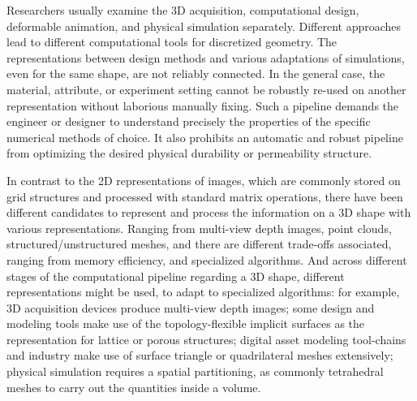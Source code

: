 Researchers usually examine the 3D acquisition, computational design, deformable animation, and physical simulation separately. Different approaches lead to different computational tools for discretized geometry.
The representations between design methods and various adaptations of simulations, even for the same shape, are not reliably connected.
In the general case, the material, attribute, or experiment setting cannot be robustly re-used on another representation without laborious manually fixing. Such a pipeline demands the engineer or designer to understand precisely the properties of the specific numerical methods of choice. It also prohibits an automatic and robust pipeline from optimizing the desired physical durability or permeability structure.

In contrast to the 2D representations of images, which are commonly stored on grid structures and processed with standard matrix operations, there have been different candidates to represent and process the information on a 3D shape with various representations. 
Ranging from multi-view depth images, point clouds, structured/unstructured meshes, and there are different trade-offs associated, ranging from memory efficiency, and specialized algorithms. And across different stages of the computational pipeline regarding a 3D shape, different representations might be used, to adapt to specialized algorithms: for example, 3D acquisition devices produce multi-view depth images; some design and modeling tools make use of the topology-flexible implicit surfaces as the representation for lattice or porous structures; digital asset modeling tool-chains and industry make use of surface triangle or quadrilateral meshes extensively; physical simulation requires a spatial partitioning, as commonly tetrahedral meshes to carry out the quantities inside a volume. 

